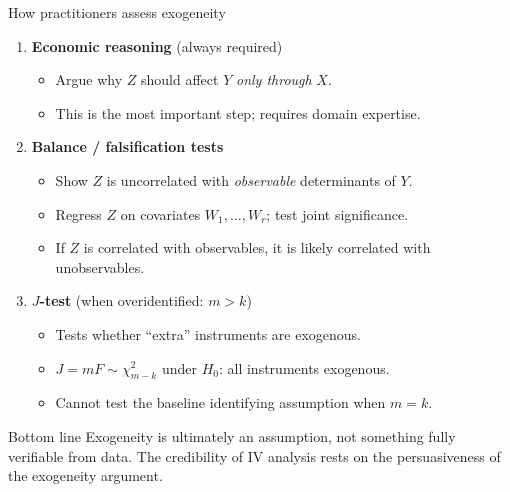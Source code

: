 \documentclass[10pt]{beamer}
\begin{document}
\begin{frame}{How practitioners assess exogeneity}
\label{slide:assess_exogeneity}

\begin{enumerate}
  \item \textbf{Economic reasoning} (always required)
  \begin{itemize}
    \item Argue why $Z$ should affect $Y$ \emph{only through} $X$.
    \item This is the most important step; requires domain expertise.
  \end{itemize}

  \pause
  \item \textbf{Balance / falsification tests}
  \begin{itemize}
    \item Show $Z$ is uncorrelated with \emph{observable} determinants of $Y$.
    \item Regress $Z$ on covariates $W_1, \ldots, W_r$; test joint significance.
    \item If $Z$ is correlated with observables, it is likely correlated with unobservables.
  \end{itemize}

  \pause
  \item \textbf{$J$-test} (when overidentified: $m > k$)
  \begin{itemize}
    \item Tests whether ``extra'' instruments are exogenous.
    \item $J = mF \sim \chi^2_{m-k}$ under $H_0$: all instruments exogenous.
    \item Cannot test the baseline identifying assumption when $m = k$.
  \end{itemize}
\end{enumerate}

\pause
\vspace{0.3em}
\begin{alertblock}{Bottom line}
Exogeneity is ultimately an \alert{assumption}, not something fully verifiable from data. The credibility of IV analysis rests on the persuasiveness of the exogeneity argument.
\end{alertblock}
\end{frame}

\end{document}
